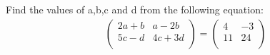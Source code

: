 Find the values of a,b,c and d from the following equation:\\
\begin{equation}
\begin{aligned}
   \begin{pmatrix}
      2a+b       & a-2b\\ 
      5c-d       & 4c+3d\\    
     \end{pmatrix} =
    \begin{pmatrix}
      4       &-3\\ 
      11       &24\\
     \end{pmatrix}\\
\end{aligned}
\end{equation}






